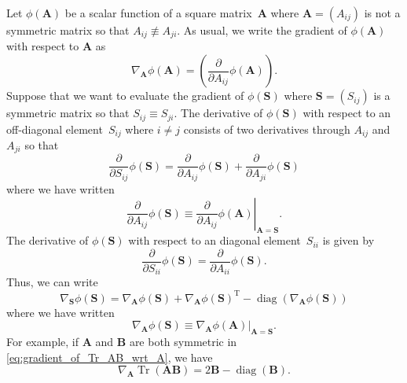 \documentclass[12pt,a4paper]{article}
\begin{document}
Let $\phi(\mathbf{A})$ be a scalar function of a square matrix~$\mathbf{A}$
where $\mathbf{A} = \left(A_{ij}\right)$ is not a symmetric matrix so that
$A_{ij} \not\equiv A_{ji}$.
As usual, we write the gradient of $\phi(\mathbf{A})$ with respect to $\mathbf{A}$ as
\begin{equation}
\nabla_{\mathbf{A}} \phi(\mathbf{A})
= \left( \frac{\partial}{\partial A_{ij}} \phi(\mathbf{A}) \right) .
\end{equation}
Suppose that we want to evaluate the gradient of $\phi(\mathbf{S})$ where
$\mathbf{S} = \left(S_{ij}\right)$ is a symmetric matrix so that $S_{ij} \equiv S_{ji}$.
The derivative of $\phi(\mathbf{S})$ with respect to
an off-diagonal element~$S_{ij}$ where $i \neq j$
consists of two derivatives through $A_{ij}$ and $A_{ji}$ so that
\begin{equation}
\frac{\partial}{\partial S_{ij}} \phi(\mathbf{S})
= \frac{\partial}{\partial A_{ij}} \phi(\mathbf{S})
+ \frac{\partial}{\partial A_{ji}} \phi(\mathbf{S})
\label{eq:derivative_of_scalar_wrt_S_ij}
\end{equation}
where we have written
\begin{equation}
\frac{\partial}{\partial A_{ij}} \phi(\mathbf{S})
\equiv \left.
\frac{\partial}{\partial A_{ij}} \phi(\mathbf{A}) \right|_{\mathbf{A} = \mathbf{S}} .
\end{equation}
The derivative of $\phi(\mathbf{S})$ with respect to an diagonal element~$S_{ii}$ is given by
\begin{equation}
\frac{\partial}{\partial S_{ii}} \phi(\mathbf{S})
= \frac{\partial}{\partial A_{ii}} \phi(\mathbf{S}) .
\label{eq:derivative_of_scalar_wrt_S_ii}
\end{equation}
Thus, we can write
\begin{equation}
\nabla_{\mathbf{S}} \phi(\mathbf{S})
= \nabla_{\mathbf{A}} \phi(\mathbf{S})
+ \nabla_{\mathbf{A}} \phi(\mathbf{S})^{\operatorname{T}}
- \operatorname{diag}\left( \nabla_{\mathbf{A}} \phi(\mathbf{S}) \right)
\label{eq:gradient_of_scalar_wrt_symmetric_matrix}
\end{equation}
where we have written
\begin{equation}
\nabla_{\mathbf{A}} \phi(\mathbf{S})
\equiv \left.
\nabla_{\mathbf{A}} \phi(\mathbf{A})
\right|_{\mathbf{A} = \mathbf{S}} .
\end{equation}
For example, if $\mathbf{A}$ and $\mathbf{B}$ are both symmetric in
\eqref{eq:gradient_of_Tr_AB_wrt_A}, we have
\begin{equation}
\nabla_{\mathbf{A}} \operatorname{Tr}\left(\mathbf{A}\mathbf{B}\right)
= 2\mathbf{B} - \operatorname{diag}(\mathbf{B}) .
\end{equation}
\end{document}
